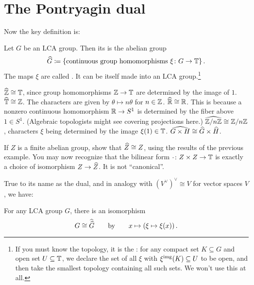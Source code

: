 \section{The Pontryagin dual}
Now the key definition is:
\begin{definition}
	Let $G$ be an LCA group.
	Then its  is the abelian group
	\[ \widehat G \coloneqq \left\{ \text{continuous group homomorphisms }
			\xi \colon G \to \mathbb T \right\}. \]
	The maps $\xi$ are called .
	It can be itself made into an LCA group.\footnote{If you must
		know the topology, it is the :
		for any compact set $K \subseteq G$
		and open set $U \subseteq \mathbb T$,
		we declare the set of all $\xi$ with $\xi^{\text{img}}(K) \subseteq U$ to be open,
		and then take the smallest topology
		containing all such sets. We won't use this at all.}
\end{definition}
\begin{example}
	\listhack
	\begin{itemize}
		\ii $\widehat{\mathbb Z} \cong \mathbb T$,
		since group homomorphisms $\mathbb Z \to \mathbb T$ are determined by the image of $1$.
		\ii $\widehat{\mathbb T} \cong \mathbb Z$.
		The characters are given by $\theta \mapsto n\theta$ for $n \in \mathbb Z$.
		\ii $\widehat{\mathbb R} \cong \mathbb R$.
		This is because a nonzero continuous homomorphism
		$\mathbb R \to S^1$ is determined by the fiber above $1 \in S^1$.
		(Algebraic topologists might see covering projections here.)
		\ii $\widehat{\mathbb Z/n\mathbb Z} \cong \mathbb Z/n\mathbb Z$,
		characters $\xi$ being determined by the image $\xi(1) \in \mathbb T$.
		\ii $\widehat{G \times H} \cong \widehat G \times \widehat H$.
	\end{itemize}
\end{example}
\begin{exercise}
	If $Z$ is a finite abelian group, show that $\widehat Z \cong Z$,
	using the results of the previous example.
	You may now recognize that the bilinear form
	$\cdot \colon Z \times Z \to \mathbb T$
	is exactly a choice of isomorphism $Z \to \widehat Z$.
	It is not ``canonical''.
\end{exercise}

True to its name as the dual,
and in analogy with $(V^\vee)^\vee \cong V$ for vector spaces $V$, we have:
\begin{theorem}
	For any LCA group $G$, there is an isomorphism
	\[ G \cong \widehat{\widehat G} \qquad \text{by} \qquad
		x \mapsto \left( \xi \mapsto \xi(x) \right). \]
\end{theorem}

